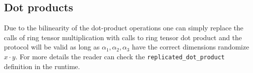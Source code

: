 \subsection{Dot products}


Due to the bilinearity of the dot-product operations
one can simply replace the calls of ring tensor multiplication with
calls to ring tensor dot product and the protocol will be valid as long as
$\alpha_1, \alpha_2, \alpha_3$ have the correct dimensions
randomize $x \cdot y$. For more details the reader can check the
\verb|replicated_dot_product| definition in the runtime.





